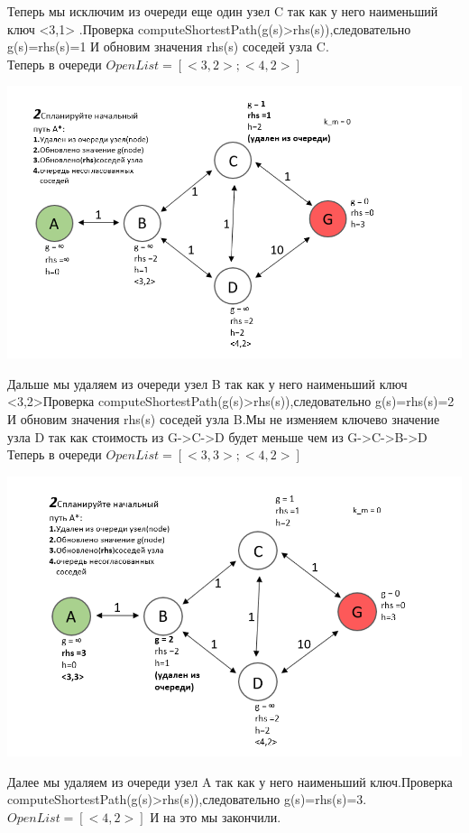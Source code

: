 \documentclass[12pt]{article}
\begin{document}
Теперь мы исключим из очереди еще один узел C так как у него наименьший ключ <3,1> .Проверка computeShortestPath(g(s)>rhs(s)),следовательно g(s)=rhs(s)=1 И обновим значения rhs(s) соседей узла C.\\Теперь в очереди $OpenList=[<3,2>;<4,2>]$
\begin{center}
        \includegraphics[width=1\textwidth]{img/example2_2.png}
    \end{center}
Дальше мы удаляем из очереди узел B так как у него наименьший ключ <3,2>Проверка computeShortestPath(g(s)>rhs(s)),следовательно g(s)=rhs(s)=2 И обновим значения rhs(s) соседей узла B.Мы не изменяем ключево значение узла D так как стоимость из G->C->D будет меньше чем из G->C->B->D
\\Теперь в очереди $OpenList=[<3,3>;<4,2>]$
\begin{center}
        \includegraphics[width=1\textwidth]{img/example2_3.png}
    \end{center}
Далее мы удаляем из очереди узел A так как у него наименьший ключ.Проверка computeShortestPath(g(s)>rhs(s)),следовательно g(s)=rhs(s)=3. $OpenList=[<4,2>]$ И на это мы закончили.
\end{document}
